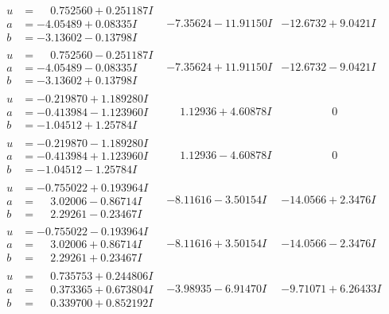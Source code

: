 \documentclass[1p]{elsarticle_modified}
\theoremstyle{definition}
\begin{document}
$$\begin{array}{c|c|c}
\begin{aligned}
u &= \phantom{-}0.752560 + 0.251187 I \\
a &= -4.05489 + 0.08335 I \\
b &= -3.13602 - 0.13798 I\end{aligned}
 & -7.35624 - 11.91150 I & -12.6732 + 9.0421 I \\ \hline\begin{aligned}
u &= \phantom{-}0.752560 - 0.251187 I \\
a &= -4.05489 - 0.08335 I \\
b &= -3.13602 + 0.13798 I\end{aligned}
 & -7.35624 + 11.91150 I & -12.6732 - 9.0421 I \\ \hline\begin{aligned}
u &= -0.219870 + 1.189280 I \\
a &= -0.413984 - 1.123960 I \\
b &= -1.04512 + 1.25784 I\end{aligned}
 & \phantom{-}1.12936 + 4.60878 I & \phantom{-0.000000 } 0 \\ \hline\begin{aligned}
u &= -0.219870 - 1.189280 I \\
a &= -0.413984 + 1.123960 I \\
b &= -1.04512 - 1.25784 I\end{aligned}
 & \phantom{-}1.12936 - 4.60878 I & \phantom{-0.000000 } 0 \\ \hline\begin{aligned}
u &= -0.755022 + 0.193964 I \\
a &= \phantom{-}3.02006 - 0.86714 I \\
b &= \phantom{-}2.29261 - 0.23467 I\end{aligned}
 & -8.11616 - 3.50154 I & -14.0566 + 2.3476 I \\ \hline\begin{aligned}
u &= -0.755022 - 0.193964 I \\
a &= \phantom{-}3.02006 + 0.86714 I \\
b &= \phantom{-}2.29261 + 0.23467 I\end{aligned}
 & -8.11616 + 3.50154 I & -14.0566 - 2.3476 I \\ \hline\begin{aligned}
u &= \phantom{-}0.735753 + 0.244806 I \\
a &= \phantom{-}0.373365 + 0.673804 I \\
b &= \phantom{-}0.339700 + 0.852192 I\end{aligned}
 & -3.98935 - 6.91470 I & -9.71071 + 6.26433 I \\ \hline\begin{aligned}

\end{aligned}
\end{array}$$
\end{document}
